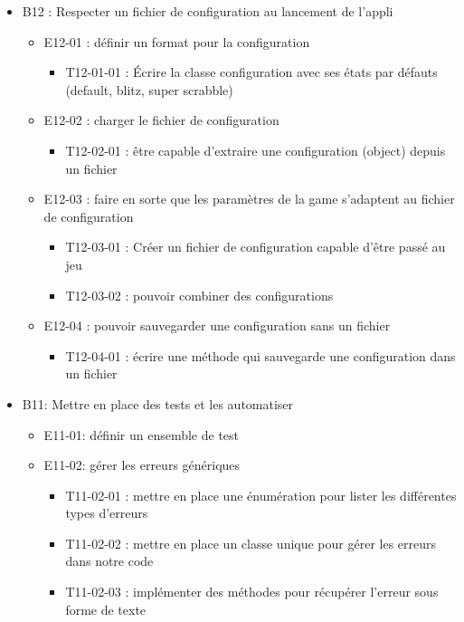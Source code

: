 \documentclass[a4paper,12pt]{article}
\begin{document}
\begin{itemize}
    \item B12 : Respecter un fichier de configuration au lancement de l’appli
    \begin{itemize}
        \item E12-01 : définir un format pour la configuration
        \begin{itemize}[label=$\square$]
            \item T12-01-01 : Écrire la classe configuration avec ses états par défauts (default, blitz, super scrabble)
        \end{itemize}
    \end{itemize}
\begin{itemize}
    \item E12-02 : charger le fichier de configuration
    \begin{itemize}[label=$\square$]
        \item T12-02-01 : être capable d'extraire une configuration (object) depuis un fichier \cite{JavaParsers}
    \end{itemize}
    \item E12-03 : faire en sorte que les paramètres de la game s’adaptent au fichier de configuration
    \begin{itemize}[label=$\square$]
            \item T12-03-01 : Créer un fichier de configuration capable d'être passé au jeu
            \item T12-03-02 : pouvoir combiner des configurations
        \end{itemize}
    \item E12-04 : pouvoir sauvegarder une configuration sans un fichier
    \begin{itemize}[label=$\square$]
            \item T12-04-01 : écrire une méthode qui sauvegarde une configuration dans un fichier
        \end{itemize}
    \end{itemize}
\end{itemize}


\begin{itemize}
    \item B11: Mettre en place des tests et les automatiser
    \begin{itemize}
        \item E11-01: définir un ensemble de test
        \item E11-02: gérer les erreurs génériques
        \begin{itemize}[label=$\square$]
            \item T11-02-01 : mettre en place une énumération pour lister les différentes types d'erreurs
            \item T11-02-02 : mettre en place un classe unique pour gérer les erreurs dans notre code
            \item T11-02-03 : implémenter des méthodes pour récupérer l'erreur sous forme de texte
        \end{itemize}
    \end{itemize}
\end{itemize}







\end{document}
